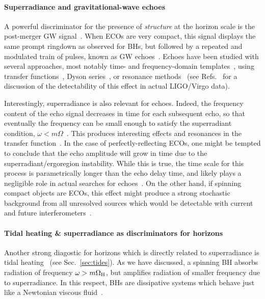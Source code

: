 \documentclass[11pt]{article}
\numberwithin{equation}{section} %
\begin{document}
\paragraph{Superradiance and gravitational-wave echoes}
A powerful discriminator for the presence of \emph{structure} at the horizon scale is the post-merger GW 
signal~\cite{Cardoso:2016rao,Cardoso:2016oxy}. When ECOs are very compact, this signal displays the same prompt 
ringdown as observed for BHs, but followed by a repeated and modulated train of pulses, known as GW 
echoes~\cite{Cardoso:2016oxy,Abedi:2016hgu}. Echoes have been studied with several approaches, most notably time- and 
frequency-domain 
templates~\cite{Abedi:2016hgu,Abedi:2017isz,Nakano:2017fvh,Testa:2018bzd,Maggio:2019zyv,Micchi:2019yze}, using transfer 
functions~\cite{Mark:2017dnq,Bueno:2017hyj,Testa:2018bzd}, Dyson series~\cite{Correia:2018apm}, or resonance 
methods~\cite{Conklin:2017lwb,Conklin:2019fcs} (see 
Refs.~\cite{Westerweck:2017hus,Tsang:2018uie,Nielsen:2018lkf,Lo:2018sep,
Wang:2019rcf,Uchikata:2019frs,Oshita:2020dox,Abedi:2020ujo} for a discussion of the detectability of this effect in 
actual LIGO/Virgo data).

Interestingly, superradiance is also relevant for echoes. Indeed, the frequency content of the echo signal decreases in 
time for each subsequent echo, so that eventually the frequency can be small enough to satisfy the superradiant 
condition, $\omega<m\Omega$~\cite{Nakano:2017fvh,Maggio:2019zyv}. This produces interesting effects and resonances in 
the transfer function~\cite{Maggio:2019zyv}.
%
In the case of perfectly-reflecting ECOs, one might be tempted to conclude that the echo amplitude will grow in time 
due to the superradiant/ergoregion instability. While this is true, the time scale for this process is parametrically 
longer than the echo delay time, and likely plays a negligible role in actual searches for echoes~\cite{Maggio:2019zyv}.
%
On the other hand, if spinning compact objects are ECOs, this effect might produce a strong stochastic background from 
all unresolved sources which would be detectable with current and future interferometers~\cite{Barausse:2018vdb}.


\paragraph{Tidal heating \& superradiance as discriminators for horizons}
Another strong diagostic for horizons which is directly related to superradiance is tidal 
heating~\cite{Hartle:1973zz,Hughes:2001jr} (see Sec.~\ref{sec:tides}).
%
As we have discussed, a spinning BH absorbs radiation of frequency $\omega>m\Omega_{\rm H}$, 
but amplifies radiation of smaller frequency due to superradiance. In this respect, BHs are dissipative systems which 
behave just like a Newtonian viscous fluid~\cite{Damour_viscous,Poisson:2009di,Cardoso:2012zn}. 
\end{document}
